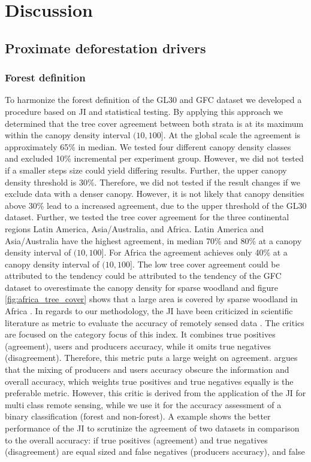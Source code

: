 \chapter{Discussion}
\label{ch:discussion}
	\section{Proximate deforestation drivers}
	\label{sec:discussion_deforestation}

		\subsection{Forest definition}
		\label{subsec:discussion_forest_definition}
			To harmonize the forest definition of the \ac{GL30} and \ac{GFC} dataset we developed a procedure based on \ac{JI} and statistical testing. By applying this approach we determined that the tree cover agreement between both strata is at its maximum within the canopy density interval $(10,100]$. At the global scale the agreement is approximately 65\% in median. We tested four different canopy density classes and excluded 10\% incremental per experiment group. However, we did not tested if a smaller steps size could yield differing results. Further, the upper canopy density threshold is 30\%. Therefore, we did not tested if the result changes if we exclude data with a denser canopy. However, it is not likely that canopy densities above 30\% lead to a increased agreement, due to the upper threshold of the \ac{GL30} dataset. Further, we tested the tree cover agreement for the three continental regions Latin America, Asia/Australia, and Africa. Latin America and Asia/Australia have the highest agreement, in median 70\% and 80\% at a canopy density interval of $(10,100]$. For Africa the agreement achieves only 40\% at a canopy density interval of $(10,100]$. The low tree cover agreement could be attributed to the tendency could be attributed to the tendency of the \ac{GFC} dataset to overestimate the canopy density for sparse woodland and figure \ref{fig:africa_tree_cover} shows that a large area is covered by sparse woodland in Africa \citep{Gross2017}. In regards to our methodology, the \ac{JI} have been criticized in scientific literature as metric to evaluate the accuracy of remotely sensed data \citep{Li2017a}. The critics are focused on the category focus of this index. It combines true positives (agreement), users and producers accuracy, while it omits true negatives (disagreement). Therefore, this metric puts a large weight on agreement. \citeauthor{Li2017a} argues that the mixing of producers and users accuracy obscure the information and overall accuracy, which weights true positives and true negatives equally is the preferable metric. However, this critic is derived from the application of the \ac{JI} for multi class remote sensing, while we use it for the accuracy assessment of a binary classification (forest and non-forest). A example shows the better performance of the \ac{JI} to scrutinize the agreement of two datasets in comparison to the overall accuracy: if true positives (agreement) and true negatives (disagreement) are equal sized and false negatives (producers accuracy), and false 